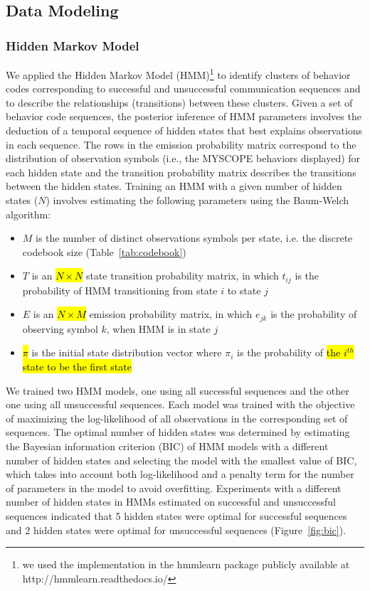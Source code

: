 \subsection{Data Modeling}
\label{subsec:dataModeling}
\subsubsection{Hidden Markov Model}
\label{subsubsec:hiddenMarkovModel}
We applied the Hidden Markov Model (HMM)\footnote{we used the implementation in the hmmlearn package publicly available at http://hmmlearn.readthedocs.io/} to identify clusters of behavior codes corresponding to successful and unsuccessful communication sequences and to describe the relationships (transitions) between these clusters. Given a set of behavior code sequences, the posterior inference of HMM parameters involves the deduction of a temporal sequence of hidden states that best explains observations in each sequence. The rows in the emission probability matrix correspond to the distribution of observation symbols (i.e., the MYSCOPE behaviors displayed) for each hidden state and the transition probability matrix describes the transitions between the hidden states. Training an HMM with a given number of hidden states ($N$) involves estimating the following parameters using the Baum-Welch algorithm:

\begin{itemize}
\item $M$ is the number of distinct observations symbols per state, i.e. the discrete codebook size (Table~\ref{tab:codebook})
\item $T$ is an \hl{$N \times N$} state transition probability matrix, in which $t_{ij}$ is the probability of HMM transitioning from state $i$ to state $j$  
\item $E$ is an \hl{$N \times M$} emission probability matrix, in which $e_{jk}$ is the probability of observing symbol $k$, when HMM is in state $j$ 
\item \hl{$\pi$} is the initial state distribution vector where $\pi_i$ is the probability of \hl{the $i^{th}$ state to be the first state}
\end{itemize}

We trained two HMM models, one using all successful sequences and the other one using all unsuccessful sequences. Each model was trained with the objective of maximizing the log-likelihood of all observations in the corresponding set of sequences. The optimal number of hidden states was determined by estimating the Bayesian information criterion (BIC) of HMM models with a different number of hidden states and selecting the model with the smallest value of BIC, which takes into account both log-likelihood and a penalty term for the number of parameters in the model to avoid overfitting. Experiments with a different number of hidden states in HMMs estimated on successful and unsuccessful sequences indicated that 5 hidden states were optimal for successful sequences and 2 hidden states were optimal for unsuccessful sequences (Figure~\ref{fig:bic}). 

